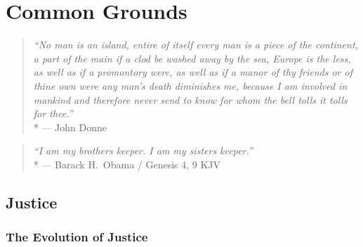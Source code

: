 
\chapter{Common Grounds} \label{chap:common-grounds}


\begin{quote}
	\emph{``No man is an island, entire of itself every man is a piece of the continent, a part of the main if a clod be washed away by the sea, Europe is the less, as well as if a promontory were, as well as if a manor of thy friends or of thine own were any man’s death diminishes me, because I am involved in mankind and therefore never send to know for whom the bell tolls it tolls for thee.''}
	\\*
	--- John Donne
\end{quote}


\begin{quote}
	\emph{``I am my brothers keeper.
	I am my sisters keeper.''}
	\\*
	--- Barack H.\ Obama / Genesis 4, 9 KJV
\end{quote}

\section{Justice}

\subsection{The Evolution of Justice}




